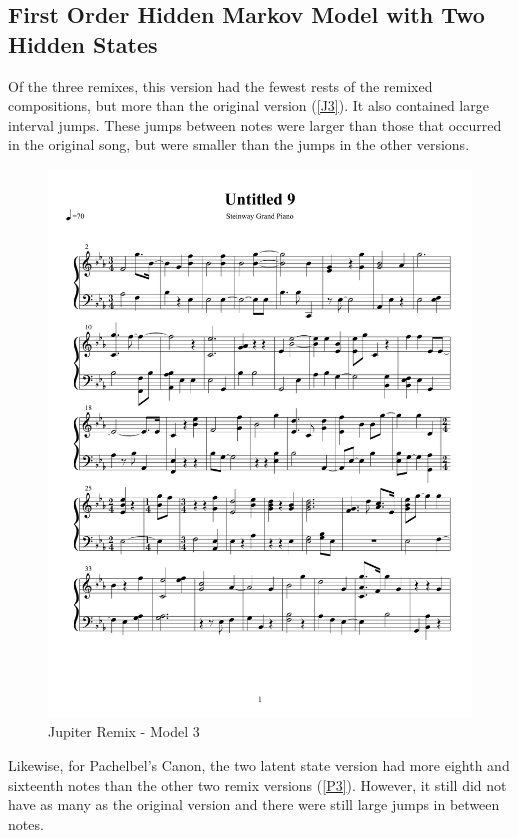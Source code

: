\documentclass{article} %
\begin{document}
\subsection{First Order Hidden Markov Model with Two Hidden States}

Of the three remixes, this version had the fewest rests of the remixed compositions, but more than the original version (\autoref{J3}). It also contained large interval jumps. These jumps between notes were larger than those that occurred in the original song, but were smaller than the jumps in the other versions. 


\begin{figure}[H]
\centering

\includegraphics [scale = 0.6] {JupiterRemix2H-cropped.pdf}
\caption{Jupiter Remix - Model 3\label{J3}}
\end{figure}

Likewise, for Pachelbel's Canon, the two latent state version had more eighth and sixteenth notes than the other two remix versions (\autoref{P3}). However, it still did not have as many as the original version and there were still large jumps in between notes. 
\end{document}
